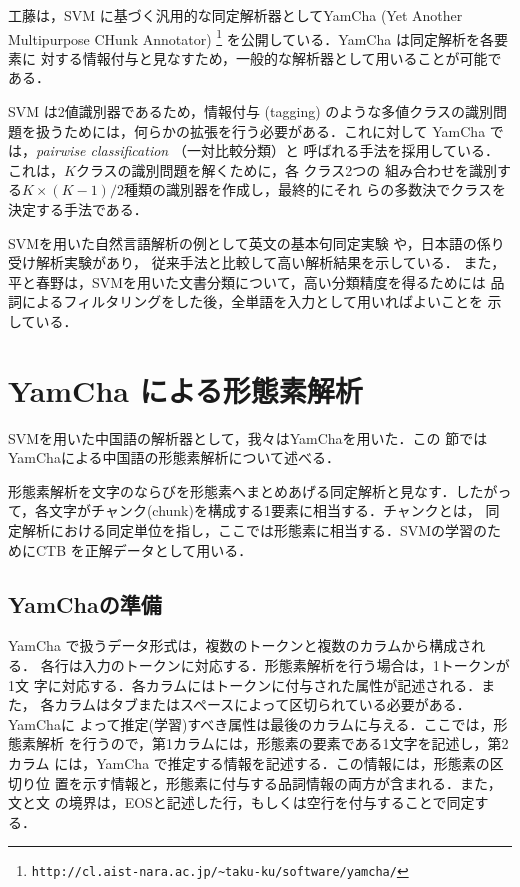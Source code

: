 工藤は，SVM に基づく汎用的な同定解析器としてYamCha (Yet Another
Multipurpose CHunk Annotator)
\footnote{\tt http://cl.aist-nara.ac.jp/\~{ }taku-ku/software/yamcha/}
を公開している．YamCha は同定解析を各要素に
対する情報付与と見なすため，一般的な解析器として用いることが可能である．

SVM は2値識別器であるため，情報付与 (tagging) のような多値クラスの識別問
題を扱うためには，何らかの拡張を行う必要がある．これに対して YamCha で
は，{\it pairwise classification}\cite{Kressel99} （一対比較分類）と
呼ばれる手法を採用している．これは，$K$クラスの識別問題を解くために，各
クラス2つの
組み合わせを識別する$K\times(K-1)/2$種類の識別器を作成し，最終的にそれ
らの多数決でクラスを決定する手法である．

SVMを用いた自然言語解析の例として英文の基本句同定実験\cite{Kudo2000b}
や，日本語の係り受け解析実験\cite{Kudo2002b}があり，
従来手法と比較して高い解析結果を示している．
また，平と春野は，SVMを用いた文書分類について，高い分類精度を得るためには
品詞によるフィルタリングをした後，全単語を入力として用いればよいことを
示している\cite{Taira2000}．

\section{YamCha による形態素解析}
\label{節:形態素解析}

SVMを用いた中国語の解析器として，我々はYamChaを用いた．この
節ではYamChaによる中国語の形態素解析について述べる．

形態素解析を文字のならびを形態素へまとめあげる同定解析と見なす．したがっ
て，各文字がチャンク(chunk)を構成する1要素に相当する．チャンクとは，
同定解析における同定単位を指し，ここでは形態素に相当する．SVMの学習のた
めにCTB を正解データとして用いる．


\subsection{YamChaの準備}

YamCha で扱うデータ形式は，複数のトークンと複数のカラムから構成される．
各行は入力のトークンに対応する．形態素解析を行う場合は，1トークンが1文
字に対応する．各カラムにはトークンに付与された属性が記述される．また，
各カラムはタブまたはスペースによって区切られている必要がある．YamChaに
よって推定(学習)すべき属性は最後のカラムに与える．ここでは，形態素解析
を行うので，第1カラムには，形態素の要素である1文字を記述し，第2カラム
には，YamCha で推定する情報を記述する．この情報には，形態素の区切り位
置を示す情報と，形態素に付与する品詞情報の両方が含まれる．また，文と文
の境界は，EOSと記述した行，もしくは空行を付与することで同定する．

